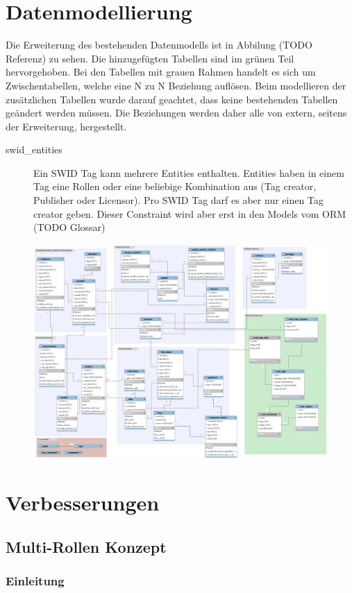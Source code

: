 \section{Datenmodellierung}
Die Erweiterung des bestehenden Datenmodells ist in Abbilung (TODO Referenz) zu sehen. Die hinzugefügten Tabellen sind im grünen Teil hervorgehoben. Bei den Tabellen mit grauen Rahmen handelt es sich um Zwischentabellen, welche eine N zu N Beziehung auflösen. Beim modellieren der zusätzlichen Tabellen wurde darauf geachtet, dass keine bestehenden Tabellen geändert werden müssen. Die Beziehungen werden daher alle von extern, seitens der Erweiterung, hergestellt.
\begin{description}
\item [swid\_entities] Ein SWID Tag kann mehrere Entities enthalten. Entities haben in einem Tag eine Rollen oder eine beliebige Kombination aus (Tag creator, Publisher oder Licensor). Pro SWID Tag darf es aber nur einen Tag creator geben. Dieser Constraint wird aber erst in den Models vom ORM (TODO Glossar)

\end{description}
\begin{figure}
\centering
\includegraphics[width=0.7\linewidth]{./images/db/database-model}
\caption{}
\label{fig:database-model}
\end{figure}


\section{Verbesserungen}

\subsection{Multi-Rollen Konzept}

\subsubsection{Einleitung}

